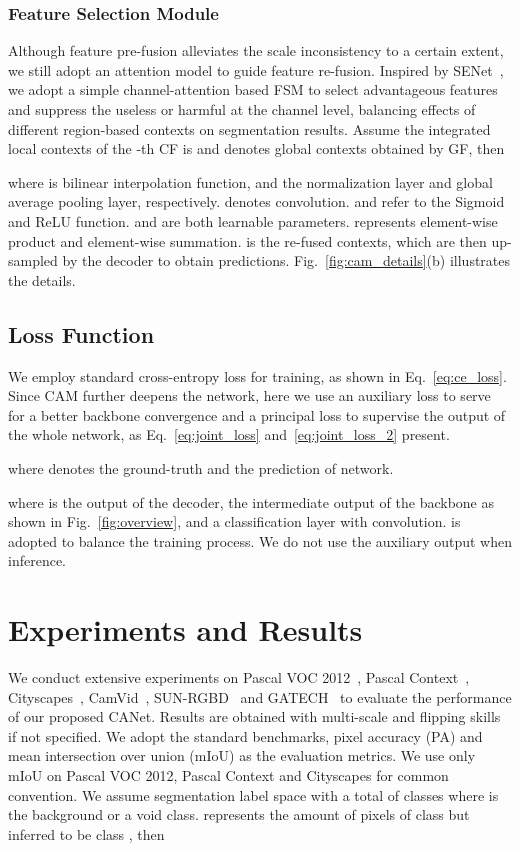 \documentclass[journal]{IEEEtran}
\begin{document}
\subsubsection{Feature Selection Module}
Although feature pre-fusion alleviates the scale inconsistency to a certain extent, we still adopt an attention model to guide feature re-fusion. Inspired by SENet~\cite{hu2018squeeze}, we adopt a simple channel-attention based FSM to select advantageous features and suppress the useless or harmful at the channel level, balancing effects of different region-based contexts on segmentation results. Assume the integrated local contexts of the -th CF is  and  denotes global contexts obtained by GF, then



where  is bilinear interpolation function,  and  the normalization layer and global average pooling layer, respectively.  denotes convolution.  and  refer to the Sigmoid and ReLU function.  and  are both learnable parameters.  represents element-wise product and  element-wise summation.  is the re-fused contexts, which are then up-sampled by the decoder to obtain predictions. Fig.~\ref{fig:cam_details}(b) illustrates the details.

\subsection{Loss Function}
\label{subsection:loss}
We employ standard cross-entropy loss for training, as shown in Eq.~\ref{eq:ce_loss}. Since CAM further deepens the network, here we use an auxiliary loss to serve for a better backbone convergence and a principal loss to supervise the output of the whole network, as Eq.~\ref{eq:joint_loss} and~\ref{eq:joint_loss_2} present.

where  denotes the ground-truth and  the prediction of network.



where  is the output of the decoder,  the intermediate output of the backbone as shown in Fig.~\ref{fig:overview}, and  a classification layer with  convolution.  is adopted to balance the training process. We do not use the auxiliary output when inference.

\section{Experiments and Results}
\label{section:experiments}
We conduct extensive experiments on Pascal VOC 2012~\cite{everingham2010pascal}, Pascal Context~\cite{mottaghi2014role}, Cityscapes~\cite{Cordts_2016_CVPR}, CamVid~\cite{brostow2009semantic}, SUN-RGBD~\cite{song2015sun} and GATECH~\cite{hussain2013geometric} to evaluate the performance of our proposed CANet. Results are obtained with multi-scale and flipping skills if not specified. We adopt the standard benchmarks, pixel accuracy (PA) and mean intersection over union (mIoU) as the evaluation metrics. We use only mIoU on Pascal VOC 2012, Pascal Context and Cityscapes for common convention. We assume segmentation label space  with a total of  classes where  is the background or a void class.  represents the amount of pixels of class  but inferred to be class , then
\end{document}
